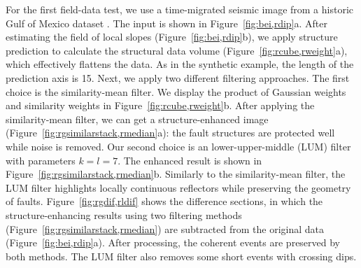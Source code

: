 For the first field-data test, we use a time-migrated seismic 
image from a historic Gulf of Mexico dataset
\cite[]{Claerbout08a}. The input is shown in 
Figure~\ref{fig:bei,rdip}a. After estimating the field of local slopes
(Figure~\ref{fig:bei,rdip}b), we apply structure prediction to
calculate the structural data volume
(Figure~\ref{fig:rcube,rweight}a), which effectively flattens the
data. As in the synthetic example, the length of the prediction axis
is 15. Next, we apply two different filtering approaches. The first
choice is the similarity-mean filter. We display the product of
Gaussian weights and similarity weights in
Figure~\ref{fig:rcube,rweight}b. After applying the similarity-mean
filter, we can get a structure-enhanced image
(Figure~\ref{fig:rgsimilarstack,rmedian}a): the fault structures are
protected well while noise is removed. Our second choice is an
lower-upper-middle (LUM) filter with parameters $k=l=7$. The enhanced
result is shown in Figure~\ref{fig:rgsimilarstack,rmedian}b. Similarly
to the similarity-mean filter, the LUM filter highlights locally
continuous reflectors while preserving the geometry of
faults. Figure~\ref{fig:rgdif,rldif} shows the difference sections, in
which the structure-enhancing results using two filtering methods
(Figure~\ref{fig:rgsimilarstack,rmedian}) are subtracted from the
original data (Figure~\ref{fig:bei,rdip}a). After processing, the
coherent events are preserved by both methods. The LUM filter also
removes some short events with crossing dips.



              

